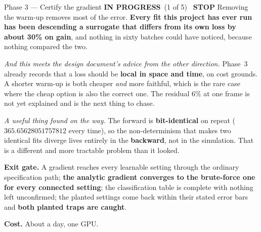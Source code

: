 \documentclass[11pt,a4paper]{article}
\newcommand{\prog}{\textcolor{warn}{\textbf{IN PROGRESS}}}
\newcommand{\stopp}{\textcolor{bad!30!white}{\textbf{STOP}}}
\begin{document}
\begin{phasebox}{Phase 3 --- Certify the gradient \hfill \prog\ (1 of 5) \ \stopp}
\noindent Removing the warm-up removes most of the error. \textbf{Every fit this project has ever
run has been descending a surrogate that differs from its own loss by about 30\% on gain}, and
nothing in sixty batches could have noticed, because nothing compared the two.

\emph{And this meets the design document's advice from the other direction.} Phase~3 already
records that a loss should be \textbf{local in space and time}, on cost grounds. A shorter warm-up
is both cheaper \emph{and} more faithful, which is the rare case where the cheap option is also the
correct one. The residual 6\% at one frame is not yet explained and is the next thing to chase.

\emph{A useful thing found on the way.} The forward is \textbf{bit-identical} on repeat
($365.65628051757812$ every time), so the non-determinism that makes two identical fits diverge
lives entirely in the \textbf{backward}, not in the simulation. That is a different and more
tractable problem than it looked.

\medskip
\textbf{Exit gate.} A gradient reaches every learnable setting through the ordinary specification
path; \textbf{the analytic gradient converges to the brute-force one for every connected setting};
the classification table is complete with nothing left unconfirmed; the planted settings come
back within their stated error bars and \textbf{both planted traps are caught}.

\textbf{Cost.} About a day, one GPU.
\end{phasebox}
\end{document}
